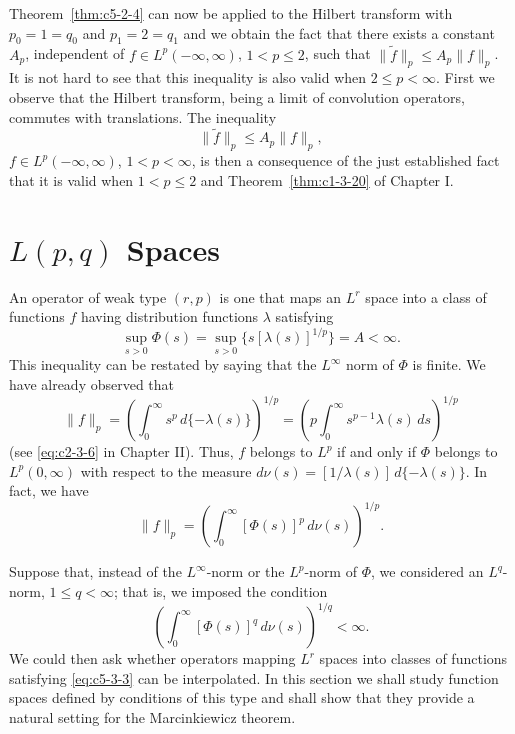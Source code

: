 Theorem~\ref{thm:c5-2-4} can now be applied to the Hilbert transform with
$p_{0} = 1 = q_{0}$ and $p_{1} = 2 = q_{1}$ and we obtain the fact that there
exists a constant $A_{p}$, independent of $f \in L^{p}(-\infty, \infty)$,
$1 < p \leq 2$, such that $\|\tilde{f}\|_{p} \leq A_{p}\|f\|_{p}$. It is not
hard to see that this inequality is also valid when $2 \leq p < \infty$. First
we observe that the Hilbert transform, being a limit of convolution operators,
commutes with translations. The inequality
\begin{equation}\label{eq:c5-2-11}
\|\tilde{f}\|_{p}\leq A_{p}\|f\|_{p},
\end{equation}
$f \in L^{p}(-\infty, \infty)$, $1 < p < \infty$, is then a consequence of the
just established fact that it is valid when $1 < p \leq 2$ and
Theorem~\ref{thm:c1-3-20} of Chapter I.

\section{\texorpdfstring{$L(p,q)$}{L(p,q)} Spaces}

An operator of weak type $(r, p)$ is one that maps an $L^{r}$ space into a
class of functions $f$ having distribution functions $\lambda$ satisfying
\begin{equation}\label{eq:c5-3-1}
\sup_{s>0}\Phi(s)=\sup_{s>0}\{s[\lambda(s)]^{1/p}\}=A<\infty.
\end{equation}
This inequality can be restated by saying that the $L^{\infty}$ norm of
$\Phi$ is finite. We have already observed that
\begin{equation}\label{eq:c5-3-2}
\|f\|_{p}=\left(\int_{0}^{\infty}s^{p}\,d\{-\lambda(s)\}\right)^{1/p}
=\left(p\int_{0}^{\infty}s^{p-1}\lambda(s)\,ds\right)^{1/p}
\end{equation}
(see \eqref{eq:c2-3-6} in Chapter II). Thus, $f$ belongs to $L^{p}$ if and only
if $\Phi$ belongs to $L^{p}(0, \infty)$ with respect to the measure
$d\nu(s) = [1/\lambda(s)]\,d\{-\lambda(s)\}$. In fact, we have
\[
\|f\|_{p}=\left(\int_{0}^{\infty}[\Phi(s)]^{p}\,d\nu(s)\right)^{1/p}.
\]

Suppose that, instead of the $L^{\infty}$-norm or the $L^{p}$-norm of $\Phi$,
we considered an $L^{q}$-norm, $1 \leq q < \infty$; that is, we imposed the
condition
\begin{equation}\label{eq:c5-3-3}
\left(\int_{0}^{\infty}[\Phi(s)]^{q}\,d\nu(s)\right)^{1/q}<\infty.
\end{equation}
We could then ask whether operators mapping $L^{r}$ spaces into classes of
functions satisfying \eqref{eq:c5-3-3} can be interpolated. In this section we
shall study function spaces defined by conditions of this type and shall show
that they provide a natural setting for the Marcinkiewicz theorem.

